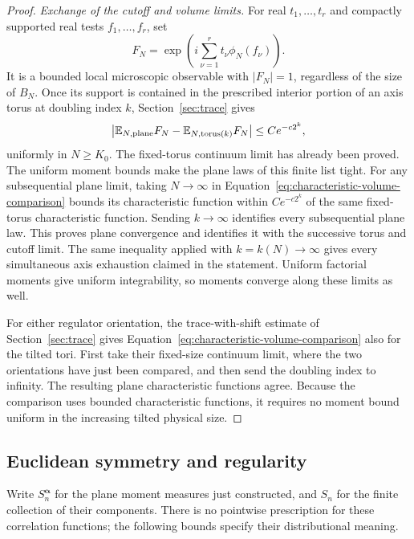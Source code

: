 \begin{proof}
\emph{Exchange of the cutoff and volume limits.}
For real $t_1,\ldots,t_r$ and compactly supported real tests
$f_1,\ldots,f_r$, set
\[
       F_N=\exp\!\left(i\sum_{\nu=1}^rt_\nu\phi_N(f_\nu)\right).
\]
It is a bounded local microscopic observable with $|F_N|=1$,
regardless of the size of $B_N$.  Once its support is contained in the
prescribed interior portion of an axis torus at doubling index $k$,
Section~\ref{sec:trace} gives
\begin{equation}
 \left|\mathbb E_{N,\mathrm{plane}}F_N
          -\mathbb E_{N,\mathrm{torus}(k)}F_N\right|
       \le C e^{-c2^k},
 \label{eq:characteristic-volume-comparison}
\end{equation}
uniformly in $N\ge K_0$.  The fixed-torus continuum limit has already
been proved.  The uniform moment bounds make the plane laws of this finite list tight.
For any subsequential plane limit, taking $N\to\infty$ in
Equation~\eqref{eq:characteristic-volume-comparison} bounds its
characteristic function within $Ce^{-c2^k}$ of the same fixed-torus
characteristic function.  Sending $k\to\infty$ identifies every
subsequential plane law.  This proves plane convergence and identifies
it with the successive torus and cutoff limit.  The same inequality
applied with $k=k(N)\to\infty$ gives every simultaneous axis exhaustion
claimed in the statement.  Uniform factorial moments give uniform
integrability, so moments converge along these limits as well.

For either regulator orientation, the trace-with-shift estimate of
Section~\ref{sec:trace} gives
Equation~\eqref{eq:characteristic-volume-comparison} also for the tilted
tori.  First take their fixed-size continuum limit, where the two
orientations have just been compared, and then send the doubling index
to infinity.  The resulting plane characteristic functions agree.
Because the comparison uses bounded characteristic functions, it
requires no moment bound uniform in the increasing tilted physical
size.
\end{proof}

\subsection{Euclidean symmetry and regularity}

Write $S_n^{\boldsymbol\alpha}$ for the plane moment measures just
constructed, and $S_n$ for the finite collection of their components.
There is no pointwise prescription for these correlation functions;
the following bounds specify their distributional meaning.

